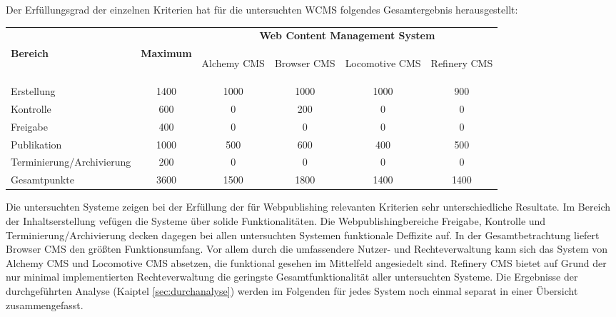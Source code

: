 Der Erfüllungsgrad der einzelnen Kriterien hat für die untersuchten WCMS folgendes Gesamtergebnis herausgestellt:

\begin{table}[!h]
\renewcommand{\arraystretch}{1.5}
\center
\begin{tabular}{|l|c|c|c|c|c|}
\hline
& & \multicolumn{4}{c|}{\textbf{Web Content Management System}} \\[2pt]
\cline{3-6}
\textbf{Bereich}& \textbf{Maximum} &
\begin{sideways}
Alchemy CMS
\end{sideways}
&\begin{sideways}
Browser CMS
\end{sideways}
&\begin{sideways}
Locomotive CMS
\end{sideways}
&\begin{sideways}
Refinery CMS
\end{sideways} \\
\hline
Erstellung & 1400 & 1000 & 1000 & 1000 & 900 \\
\hline
Kontrolle & 600 & 0 & 200 & 0 & 0 \\
\hline
Freigabe & 400 & 0 & 0 & 0 & 0 \\
\hline
Publikation & 1000 & 500 & 600 & 400 & 500 \\
\hline
Terminierung/Archivierung & 200 & 0 & 0 & 0 & 0 \\
\hline
\hline
Gesamtpunkte & 3600 & 1500 & 1800 & 1400 & 1400 \\
\hline
\end{tabular}
\end{table}


Die untersuchten Systeme zeigen bei der Erfüllung der für Webpublishing relevanten Kriterien sehr unterschiedliche Resultate. Im Bereich der Inhaltserstellung vefügen die Systeme über solide Funktionalitäten. Die Webpublishingbereiche Freigabe, Kontrolle und Terminierung/Archivierung decken dagegen bei allen untersuchten Systemen funktionale Deffizite auf. In der Gesamtbetrachtung liefert Browser CMS den größten Funktionsumfang. Vor allem durch die umfassendere Nutzer- und Rechteverwaltung kann sich das System von Alchemy CMS und Locomotive CMS absetzen, die funktional gesehen im Mittelfeld angesiedelt sind. Refinery CMS bietet auf Grund der nur minimal implementierten Rechteverwaltung die geringste Gesamtfunktionalität aller untersuchten Systeme. Die Ergebnisse der durchgeführten Analyse (Kaiptel \ref{sec:durchanalyse}) werden im Folgenden für jedes System noch einmal separat in einer Übersicht zusammengefasst.


